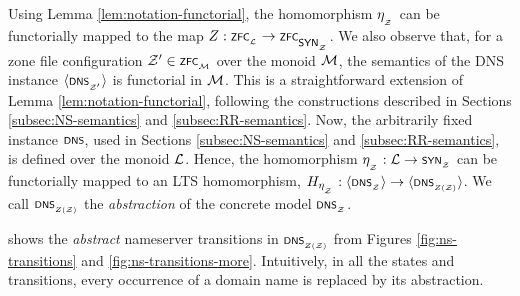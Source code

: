 Using Lemma \ref{lem:notation-functorial}, the homomorphism $\synhomZ$ can be functorially mapped to the map $Z : \scrsf{zfc}\subsub{\cal L} \rightarrow \scrsf{zfc}\subsub{\synmonZ}$. We also observe that, for a zone file configuration $\cal Z' \in \scrsf{zfc}\subsub{\monoid}$ over the monoid $\monoid$, the semantics of the DNS instance $\tup{\scrsf{dns}\subsub{\cal Z'}}$ is functorial in $\monoid$. This is a straightforward extension of Lemma \ref{lem:notation-functorial}, following the constructions described in Sections \ref{subsec:NS-semantics} and \ref{subsec:RR-semantics}. Now, the arbitrarily fixed instance $\scrsf{dns}$, used in Sections \ref{subsec:NS-semantics} and \ref{subsec:RR-semantics}, is defined over the monoid $\cal L$. Hence, the homomorphism $\synhomZ : \cal L \rightarrow \synmonZ$ can be functorially mapped to an LTS homomorphism, $H_{\synhomZ} : \tup{\scrsf{dns}\subsub{\cal Z}} \rightarrow \tup{\abstraction}$. We call $\abstraction$ the \emph{abstraction} of the concrete model $\scrsf{dns}\subsub{\cal Z}$.


 


  shows the \emph{abstract} nameserver transitions in $\abstraction$ from Figures \ref{fig:ns-transitions} and \ref{fig:ns-transitions-more}. Intuitively, in all the states and transitions, every occurrence of a domain name is replaced by its abstraction. %

